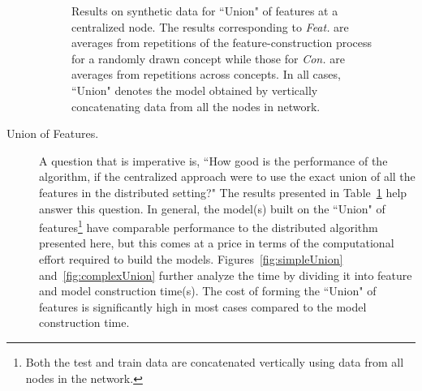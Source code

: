 \begin{description}
\begin{figure}[htb]
\caption{Results on synthetic data for ``Union" of features at a centralized node.
        The results corresponding to \emph{Feat.} are averages from repetitions of the feature-construction process
        for a randomly drawn concept while those for \emph{Con.} are averages from repetitions across concepts. In all cases, ``Union" denotes
        the model obtained by vertically concatenating data from all the nodes in network.}
\label{fig:tabUnion}
\end{figure}%
       
 \item [Union of Features.] A question that is imperative is, ``How good is the performance of the algorithm, if the centralized approach  were to use the exact union of all the features in the distributed setting?" The results presented in Table~\ref{fig:tabUnion} help answer this question. In general, the model(s) built on the ``Union" of features\footnote{Both the test and train data are concatenated vertically using data from all nodes in the network.} have comparable performance to the distributed algorithm presented here, but this comes at a price in terms of the computational effort required to build the models. Figures~\ref{fig:simpleUnion} and~\ref{fig:complexUnion} further analyze the time by dividing it into feature and model construction time(s). The cost of forming the ``Union" of features is significantly high in most cases compared to the model construction time.


\end{description}
